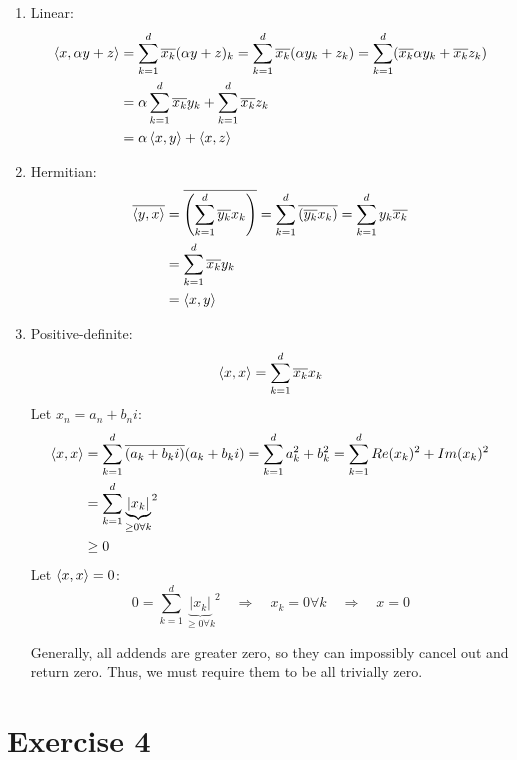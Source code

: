 \documentclass[a4paper,german,12pt,smallheadings]{scrartcl}
\begin{document}
\begin{enumerate}
\item Linear:
\begin{align*}
\braket{x,\alpha y+z}&=\sum_{k=1}^{d}\overline{x_k}(\alpha y +z)_k=\sum_{k=1}^{d}\overline{x_k}(\alpha y_k+z_k)=\sum_{k=1}^{d}(\overline{x_k}\alpha y_k + \overline{x_k}z_k)\\&=\alpha\sum_{k=1}^{d}\overline{x_k}y_k+\sum_{k=1}^{d}\overline{x_k}z_k\\
&=\alpha\braket{x,y}+\braket{x,z}
\end{align*}

\item Hermitian:
\begin{align*}
\overline{\braket{y,x}}&=\overline{\left(\sum_{k=1}^{d}\overline{y_k}x_k\right)}=\sum_{k=1}^{d}\overline{\left(\overline{y_k}x_k\right)}=\sum_{k=1}^{d}y_k\overline{x_k}\\
&=\sum_{k=1}^{d}\overline{x_k}y_k\\
&=\braket{x,y}
\end{align*}

\item Positive-definite:
\begin{equation*}
\braket{x,x}=\sum_{k=1}^{d}\overline{x_k}x_k
\end{equation*}
Let $x_n=a_n+b_ni$:
\begin{align*}
\braket{x,x}&=\sum_{k=1}^{d}\overline{(a_k+b_ki)}(a_k+b_ki)=\sum_{k=1}^{d}a_k^2+b_k^2=\sum_{k=1}^{d}Re(x_k)^2+Im(x_k)^2\\
&=\sum_{k=1}^{d}{\underbrace{|x_k|}_{\ge 0\forall k}}^2\\
&\ge 0
\end{align*}
Let $\braket{x,x}=0$:
\begin{equation*}
0=\sum_{k=1}^{d}{\underbrace{|x_k|}_{\ge 0\forall k}}^2 \quad \Rightarrow \quad x_k=0\forall k \quad \Rightarrow \quad x=0
\end{equation*}

Generally, all addends are greater zero, so they can impossibly cancel out and return zero. Thus, we must require them to be all trivially zero.

\end{enumerate}

\section*{Exercise 4}
\end{document}
